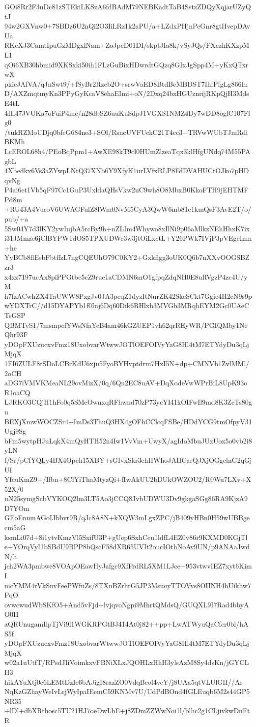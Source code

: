 GOi8Rr2F3nDc81zSTEkiLKSzA6fdBAdM79NEBKadtTaB4SstzZDQyXqjarUZyQtJ
94w2GXVnw0+7SBDz6U2nQi2O3IiLRz1k2aPU/a+LZdxPHjnPeGnr8gtHvepDAvUa
RKcXJ3CamtIpuGzMDgxlNam+ZoJpcD01DI/skptJIa8k/vSyJQs/FXczhKXzpML1
qOi6XB30hbmid9XKSxki50ih1FLzGuBixHDwrdtGQzq8GIxJgSpp4M+yKxQTxrwX
pkieJAfVA/qJnSwt9/+fSyBr2Rzeb2O+srwVaED8BtdBcMBDST7IhfPfgLg866In
D/AXZmqtmyKn3PPyGyKcaV8ehaEImi+oN/2Dxq24bxHGUznrijRKpQjH3MdsE4tL
4Hl47JVUKa7oFuiP4mc/n28dbSZ6uuKuSdpJ1VGXS1NMZ4Dy7wDD8oglC107Flg0
/tukRZMoUDjq0bfeG684ne3+SOl/RsncUVFUckC21T4cc3+TRVwWUbTJmRdiBKMh
LcEROL68h4/PEoBqPpm1+AwXE98kT9cl0HUmZlzeaTqx3klHfgUNdq74M55PAgbL
4Xbedkx6Vs3aZYwpLNtQ37XNb6Y9XfyK1urLVfxRLP8FdDVAHUCtOJko7pHDqvNg
P4ai6et1Vb5qF97Cc1GuP3UxldaQHsVkw2uC9wh8O8MbxB0KkoFTH9jEHTMFPd8m
+RU43A4VuroV6UWAGFulZ8lWm0NvM5CyA3QwW6mb81e1kmQsF3AvE2T/o/pub/+a
5Sw04Y7d3lKY2ywIujbA5rcBy9h+nZLIm4Whywo8xIlNi9p06aMlkzNEhHhxK7ix
i31JMmze6jClBYPW1dOS5TPXUDWc3w3jtOiLxctL+Y26PWk7IVjP3pVEgeImn+he
YyBCb8flEsbFbtffzL7ngCQEUhO79C0KY2+Gxkflgg3oUK0Q6b7nXXvOOGSBZzr3
x4xz7197ucAx8piPPGtbe5cZ9rue1aCDMN6mO1gfpqZdqNH0E8uRVgzP4zc4U/yM
h7fzACwhZX4TaUWW8PxgJv0JA3peqZ1dyzItNurZK42SkeSCkt7Ggic4H2cN9s9p
wYDXTrC//d15DYAPYb1f0Inj6Dq60Dik6RHlxh3MVGb3MRqhEYM2Gc0UAeCTsGSP
QBMTvS1/7msmpefYWsNfaYcB4am46kGZUEP1vh62qrREyWR/PGIQMby1NeQhr93F
yDOpFXUzucxvFmz18UxobvarWtwwJOTlOEFOIVyYaG8Hl4tM7ETYdyDu3qLjMjqX
1FI6ZULF8tSDoLCBrKdU6xju5FyoBYHvptdrm7HxI5N+dp+CMNVb1ZvlMMl/2oCH
aDG7iVMVKMeaNL29ovMizX/0q/6Qn2EC8uAV+DqXodeVwWPrBiL8UpK93oR1oaCQ
LJRKO3CQjH1hFo0q5SMeOwnxqRFhwnd70zP73ycYI41kOIFwIl9md8K3ZcTs80gu
BEXjXmwWOCZSr4+ImDs3ThuQ3HX4gOFhCClcqFSBe/HDdYCG9tmOfpyV31Ugj9Sg
bFm5wytpHJuLqkX4mQyHTH52n4Iw1VvVm+UwyX/agIdoMbuJUxUox5o0vb2i8yLN
f/Sr/pCfYQLy4BX4Opeh15XBY+sGIvxSkr3ehHWhoJAHCarQJXjOGgclnG2qGjUI
YfcuKmZ9+/Ifbn+8ClYiThaMtyzQi+fIwAkUU2bDUkOWZOU2/R0Wu7LXv+X52X/0
uN25symgScbVYKOQ2lm3LT5Ao3jCCQ8JvbUDWU3Dv9gkgaSGg86RA9KjzA9D7YOm
GEoEnumAGoIJbbvr9R/qJc8A8N+kXQW3mLgxZPC/jB409yHBn0H59wUBBgecm5aG
ksmLi07d+8i1ytvKmzVl5SxifU3P+gUep6SxhCeu1ldfL4EZ0v86r9KXMD0KGjTl
e+YOrqVyI1bSBdU9BPP8bQscF58dXR65UVIt2oucIOthNoAv9UN/p9ANAaJwdN/h
jch2WA3pmbwe8VOApOEawHyJafgc9XfFrdRL5XM1LJce+953vtwvIEZ7xyt6KimI
mcYMM4rVkSnvFeePWfuZs/8TXuBZrhtG5JP3MsuoyTTOVvs8OIINH4hUikhw7PqO
ovwcwudWbSKfO5+And5vFjd+lvjqvoNgpi9MhrtQMdsQ/GUQXL9I7Rad4bbyAO0H
aQRUnugamIlpTjVi9l1WGKRPGtBJ414At0j82++pp+LwATWyuQaCfcr0bl/hAS5f
yDOpFXUzucxvFmz18UxobvarWtwwJOTlOEFOIVyYaG8Hl4tM7ETYdyDu3qLjMjqX
w02a1uUtfT/RPsdJIiVoimkxvFBNiXLxJQOHLxHhH3ylsAzM8Sy4dsKn/jGYCLH3
hikAYuXtj0e6LEMtDzIc6bAJigI8razZO0VdqBeol4veY/j8UAa5qtVLUlGH//Ar
NqKzGZhayWeIvLrjWyIpaIEemC59KNMv7U/UdPdBOnd4fGLEuqb6M2s44GP5NR35
+lDl+dbXRthosc5TU21HJ7oeDwLhE+j8ZDmZZWwNoi1l/blhc2g1CLjivkwDnFtR
